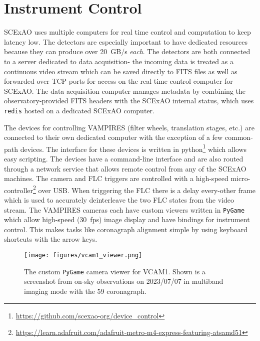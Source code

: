 \section{Instrument Control}\label{sec:control}

SCExAO uses multiple computers for real time control and computation to keep latency low. The detectors are especially important to have dedicated resources because they can produce over \qty{20}{GB/s} \textit{each}. The detectors are both connected to a server dedicated to data acquisition- the incoming data is treated as a continuous video stream which can be saved directly to FITS files as well as forwarded over TCP ports for access on the real time control computer for SCExAO. The data acquisition computer manages metadata by combining the observatory-provided FITS headers with the SCExAO internal status, which uses \texttt{redis} hosted on a dedicated SCExAO computer.

The devices for controlling VAMPIRES (filter wheels, translation stages, etc.) are connected to their own dedicated computer with the exception of a few common-path devices. The interface for these devices is written in python\footnote{\url{https://github.com/scexao-org/device_control}} which allows easy scripting. The devices have a command-line interface and are also routed through a network service that allows remote control from any of the SCExAO machines. The camera and FLC triggers are controlled with a high-speed micro-controller\footnote{\url{https://learn.adafruit.com/adafruit-metro-m4-express-featuring-atsamd51}} over USB. When triggering the FLC there is a delay every-other frame which is used to accurately deinterleave the two FLC states from the video stream. The VAMPIRES cameras each have custom viewers written in \texttt{PyGame} which allow high-speed (\qty{30}{fps}) image display and have bindings for instrument control. This makes tasks like coronagraph alignment simple by using keyboard shortcuts with the arrow keys.

\begin{figure}
    \centering
    \texttt{[image: figures/vcam1\_viewer.png]}
    \caption{The custom \texttt{PyGame} camera viewer for VCAM1. Shown is a screenshot from on-sky observations on 2023/07/07 in multiband imaging mode with the \qty{59}{\mas} coronagraph.}
    \label{fig:vcam1}
\end{figure}
